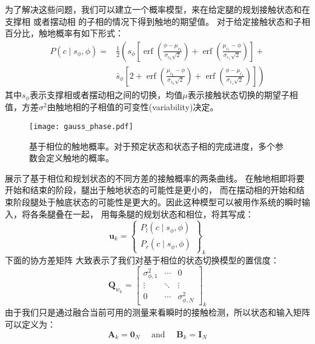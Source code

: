 为了解决这些问题，我们可以建立一个概率模型，来在给定腿的规划接触状态和在支撑相 或者摆动相 的子相的情况下得到触地的期望值。
对于给定接触状态和子相百分比，触地概率有如下形式：
\begin{equation}
    \label{equ:est_contact_prob}
    \begin{aligned}
        P\left(c \mid s_\phi, \phi\right)= & \frac{1}{2}\left(s_\phi\left[\operatorname{erf}\left(\frac{\phi-\mu_{c_0}}{\sigma_{c_0} \sqrt{2}}\right)+\operatorname{erf}\left(\frac{\mu_{c_1}-\phi}{\sigma_{c_1} \sqrt{2}}\right)\right]+\right. \\
        & \left.\bar{s}_\phi\left[2+\operatorname{erf}\left(\frac{\mu_{\bar{c}_0}-\phi}{\sigma_{\bar{c}_0} \sqrt{2}}\right)+\operatorname{erf}\left(\frac{\phi-\mu_{\bar{c}_1}}{\sigma_{\bar{c}_1} \sqrt{2}}\right)\right]\right)
        \end{aligned}
\end{equation}
其中$s_{\phi}$表示支撑相或者摆动相之间的切换，均值$\mu$表示接触状态切换的期望子相值，方差$\sigma^2$由触地相的子相值的可变性(variability)决定。
\begin{figure}[htbp]
    \centering
    \texttt{[image: gauss\_phase.pdf]}
    \caption{\label{fig:gauss_phase}基于相位的触地概率。对于预定状态和状态子相的完成进度，多个参数会定义触地的概率。}
\end{figure}
展示了基于相位和规划状态的不同方差的接触概率的两条曲线。
在触地相即将要开始和结束的阶段，腿出于触地状态的可能性是更小的，
而在摆动相的开始和结束阶段腿处于触底状态的可能性是更大的。因此这种模型可以被用作系统的瞬时输入，将各条腿叠在一起，
用每条腿的规划状态和相位，将其写成：
\begin{equation}
    \label{equ:est_input}
    \boldsymbol{u}_k=\left\{\begin{array}{c}
        P_l\left(c \mid s_\phi, \phi\right) \\
        P_r\left(c \mid s_\phi, \phi\right)
        \end{array}\right\}_k
\end{equation}
下面的协方差矩阵 大致表示了我们对基于相位的状态切换模型的置信度：
\begin{equation}
    \label{equ:est_process_noise}
    \boldsymbol{Q}_{w_k}=\left[\begin{array}{ccc}
        \sigma_{\phi, 1}^2 & \cdots & 0 \\
        \vdots & \ddots & \vdots \\
        0 & \cdots & \sigma_{\phi, N}^2
        \end{array}\right]_k
\end{equation}
由于我们只是通过融合当前可用的测量来看瞬时的接触检测，所以状态和输入矩阵可以定义为：
\begin{equation}
    \label{equ:est_process_matrix}
    \boldsymbol{A}_k=\mathbf{0}_N \quad \text { and } \quad \boldsymbol{B}_k=\mathbf{I}_N
\end{equation}

